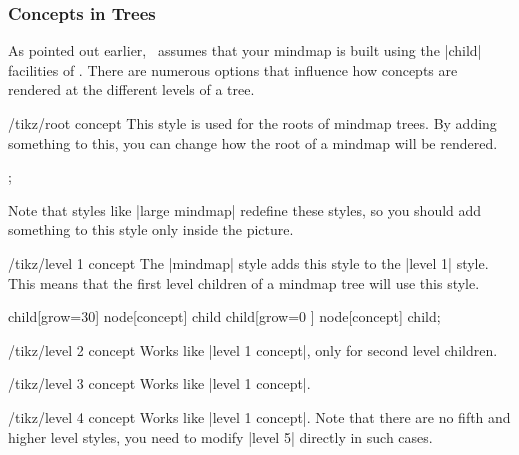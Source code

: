 \subsubsection{Concepts in Trees}

As pointed out earlier, \tikzname\ assumes that your mindmap is built using the
|child| facilities of \tikzname. There are numerous options that influence how
concepts are rendered at the different levels of a tree.

\begin{stylekey}{/tikz/root concept}
    This style is used for the roots of mindmap trees. By adding something to
    this, you can change how the root of a mindmap will be rendered.
\begin{codeexample}[preamble={\usetikzlibrary{mindmap}}]
\tikz
  [root concept/.append style={concept color=blue!80,minimum size=3.5cm},
   mindmap]
  ;
\end{codeexample}

    Note that styles like |large mindmap| redefine these styles, so you should
    add something to this style only inside the picture.
\end{stylekey}

\begin{stylekey}{/tikz/level 1 concept}
    The |mindmap| style adds this style to the |level 1| style. This means that
    the first level children of a mindmap tree will use this style.
\begin{codeexample}[preamble={\usetikzlibrary{mindmap}}]
\tikz
  [root concept/.append style={concept color=blue!80},
   level 1 concept/.append style={concept color=red!50},
   mindmap]
    child[grow=30] {node[concept] {child}}
    child[grow=0 ] {node[concept] {child}};
\end{codeexample}
\end{stylekey}

\begin{stylekey}{/tikz/level 2 concept}
    Works like |level 1 concept|, only for second level children.
\end{stylekey}

\begin{stylekey}{/tikz/level 3 concept}
    Works like |level 1 concept|.
\end{stylekey}

\begin{stylekey}{/tikz/level 4 concept}
    Works like |level 1 concept|. Note that there are no fifth and higher level
    styles, you need to modify |level 5| directly in such cases.
\end{stylekey}

